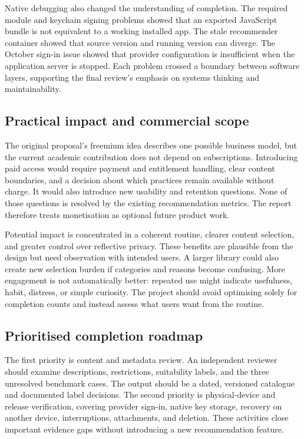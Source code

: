 Native debugging also changed the understanding of completion. The required module and keychain signing problems showed that an exported JavaScript bundle is not equivalent to a working installed app. The stale recommender container showed that source version and running version can diverge. The October sign-in issue showed that provider configuration is insufficient when the application server is stopped. Each problem crossed a boundary between software layers, supporting the final review's emphasis on systems thinking and maintainability.

\subsection{Practical impact and commercial scope}

The original proposal's freemium idea describes one possible business model, but the current academic contribution does not depend on subscriptions. Introducing paid access would require payment and entitlement handling, clear content boundaries, and a decision about which practices remain available without charge. It would also introduce new usability and retention questions. None of those questions is resolved by the existing recommendation metrics. The report therefore treats monetisation as optional future product work.

Potential impact is concentrated in a coherent routine, clearer content selection, and greater control over reflective privacy. These benefits are plausible from the design but need observation with intended users. A larger library could also create new selection burden if categories and reasons become confusing. More engagement is not automatically better: repeated use might indicate usefulness, habit, distress, or simple curiosity. The project should avoid optimising solely for completion counts and instead assess what users want from the routine.

\subsection{Prioritised completion roadmap}

The first priority is content and metadata review. An independent reviewer should examine descriptions, restrictions, suitability labels, and the three unresolved benchmark cases. The output should be a dated, versioned catalogue and documented label decisions. The second priority is physical-device and release verification, covering provider sign-in, native key storage, recovery on another device, interruptions, attachments, and deletion. These activities close important evidence gaps without introducing a new recommendation feature.

